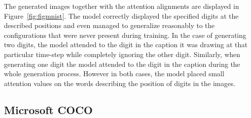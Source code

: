 \documentclass{article} %
\begin{document}
The generated images together with the attention alignments are displayed in Figure~\ref{fig:figmnist}. The model correctly displayed the specified digits at the described positions and even managed to generalize reasonably to the configurations that were never present during training. 
In the case of generating two digits, the model attended to the digit in the caption it was drawing at that particular time-step while completely ignoring the other digit. 
Similarly, when generating one digit the model attended to the digit in the caption during the whole generation process. However in both cases, the model placed small attention values on the words describing the position of digits in the images.

\subsection{Microsoft COCO}
\end{document}
